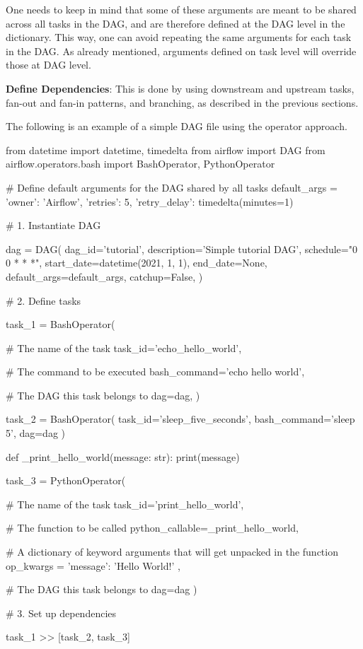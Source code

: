 One needs to keep in mind that some of these arguments are meant to be shared across all tasks in the DAG, and are
therefore defined at the DAG level in the  dictionary. This way, one can avoid repeating the same
arguments for each task in the DAG\@. As already mentioned, arguments defined on task level will override those
 at DAG level.

\item \textbf{Define Dependencies}: This is done by using downstream and upstream tasks, fan-out and fan-in patterns,
and branching, as described in the previous sections.
\een


\be
The following is an example of a simple DAG file using the operator approach.

\begin{block}
from datetime import datetime, timedelta
from airflow import DAG
from airflow.operators.bash import BashOperator, PythonOperator

# Define default arguments for the DAG shared by all tasks
default_args = {
    'owner': 'Airflow',
    'retries': 5,
    'retry_delay': timedelta(minutes=1)
}

# 1. Instantiate DAG

dag = DAG(
    dag_id='tutorial',
    description='Simple tutorial DAG',
    schedule="0 0 * * *",
    start_date=datetime(2021, 1, 1),
    end_date=None,
    default_args=default_args,
    catchup=False,
)

# 2. Define tasks

task_1 = BashOperator(

    # The name of the task
    task_id='echo_hello_world',

    # The command to be executed
    bash_command='echo hello world',

    # The DAG this task belongs to
    dag=dag,
)

task_2 = BashOperator(
    task_id='sleep_five_seconds',
    bash_command='sleep 5',
    dag=dag
)

def _print_hello_world(message: str):
    print(message)

task_3 = PythonOperator(

    # The name of the task
    task_id='print_hello_world',

    # The function to be called
    python_callable=_print_hello_world,

    # A dictionary of keyword arguments that will get unpacked in the function
    op_kwargs = {
        'message': 'Hello World!'
    },

    # The DAG this task belongs to
    dag=dag
)

# 3. Set up dependencies

task_1 >> [task_2, task_3]
\end{block}
\ee


